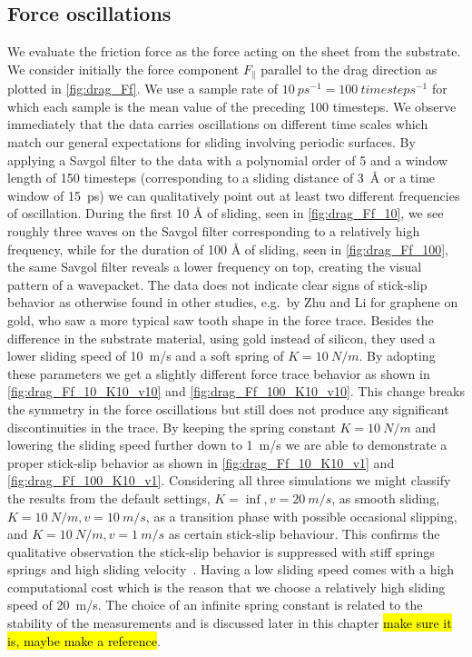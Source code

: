 \subsection{Force oscillations}\label{sec:force_oscillations}
We evaluate the friction force as the force acting on the sheet from the
substrate. We consider initially the force component $F_{\parallel}$ parallel
to the drag direction as plotted in \cref{fig:drag_Ff}. We use a sample rate of \mbox{$\SI{10}{ps^{-1}} = \SI{100}{timesteps^{-1}}$} for which each sample is the mean value of
the preceding 100 timesteps. We observe immediately that the data carries oscillations on different time scales which match our general expectations for
sliding involving periodic surfaces. By applying a Savgol filter to the data
with a polynomial order of 5 and a window length of 150 timesteps (corresponding to a
sliding distance of \SI{3}{Å} or a time window of \SI{15}{ps}) we can qualitatively point
out at least two different frequencies of oscillation. During the first 10 Å of
sliding, seen in \cref{fig:drag_Ff_10}, we see roughly three waves on the Savgol
filter corresponding to a relatively high frequency, while for the duration of
100 Å of sliding, seen in \cref{fig:drag_Ff_100}, the same Savgol filter reveals
a lower frequency on top, creating the visual pattern of a wavepacket. The data
does not indicate clear signs of stick-slip behavior as otherwise found in
other studies, e.g.\ by Zhu and Li \cite{zhu_study_2018} for graphene on gold,
who saw a more typical saw tooth shape in the force trace. Besides the difference
in the substrate material, using gold instead of silicon, they used a lower sliding
speed of \SI{10}{m/s} and a soft spring of $K = \SI{10}{N/m}$. By adopting these
parameters we get a slightly different force trace behavior as shown in
\cref{fig:drag_Ff_10_K10_v10} and \cref{fig:drag_Ff_100_K10_v10}. This change
breaks the symmetry in the force oscillations but still does not produce any
significant discontinuities in the trace. By keeping the spring constant $K =
\SI{10}{N/m}$ and lowering the sliding speed further down to \SI{1}{m/s} we are
able to demonstrate a proper stick-slip behavior as shown in
\cref{fig:drag_Ff_10_K10_v1} and \cref{fig:drag_Ff_100_K10_v1}. Considering all
three simulations we might classify the results from the default settings, $K =
\inf, v = \SI{20}{m/s}$, as smooth sliding,  $K = \SI{10}{N/m}, v =
\SI{10}{m/s}$, as a transition phase with possible occasional slipping, and $K
= \SI{10}{N/m}, v = \SI{1}{m/s}$ as certain stick-slip behaviour. This confirms the qualitative observation the stick-slip behavior is suppressed with stiff springs~\cite{bonelli_atomistic_2009} springs and high sliding velocity~\cite{liu_high-speed_2014}. Having a low sliding speed comes with a high computational cost which is the reason that we choose a relatively high sliding speed of \SI{20}{m/s}. The choice of an infinite spring constant is related to the stability of the measurements and is discussed later in this chapter \hl{make sure it is, maybe make a reference}.


